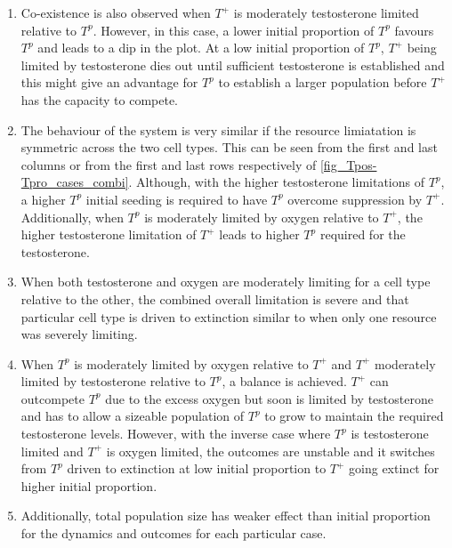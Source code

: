\begin{enumerate}
  \item Co-existence is also observed when $T^+$ is moderately testosterone limited relative to $T^p$. However, in this case, a lower initial proportion of $T^p$ favours $T^p$ and leads to a dip in the plot. At a low initial proportion of $T^p$, $T^+$ being limited by testosterone dies out until sufficient testosterone is established and this might give an advantage for $T^p$ to establish a larger population before $T^+$ has the capacity to compete.
  \item The behaviour of the system is very similar if the resource limiatation is symmetric across the two cell types. This can be seen from the first and last columns or from the first and last rows respectively of \autoref{fig_Tpos-Tpro_cases_combi}. Although, with the higher testosterone limitations of $T^p$, a higher $T^p$ initial seeding is required to have $T^p$ overcome suppression by $T^+$. Additionally, when $T^p$ is moderately limited by oxygen relative to $T^+$, the higher testosterone limitation of $T^+$ leads to higher $T^p$ required for the testosterone.
  \item When both testosterone and oxygen are moderately limiting for a cell type relative to the other, the combined overall limitation is severe and that particular cell type is driven to extinction similar to when only one resource was severely limiting.
  \item When $T^p$ is moderately limited by oxygen relative to $T^+$ and $T^+$ moderately limited by testosterone relative to $T^p$, a balance is achieved. $T^+$ can outcompete $T^p$ due to the excess oxygen but soon is limited by testosterone and has to allow a sizeable population of $T^p$ to grow to maintain the required testosterone levels. However, with the inverse case where $T^p$ is testosterone limited and $T^+$ is oxygen limited, the outcomes are unstable and it switches from $T^p$ driven to extinction at low initial proportion to $T^+$ going extinct for higher initial proportion.
  \item Additionally, total population size has weaker effect than initial proportion for the dynamics and outcomes for each particular case.
\end{enumerate}

